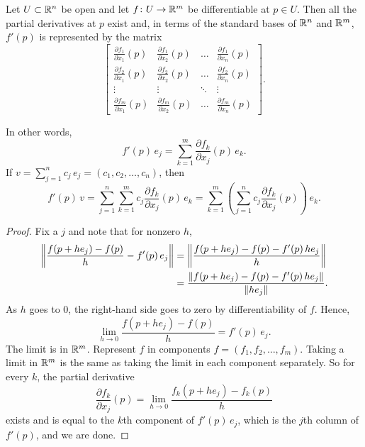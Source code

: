 \begin{prop} \label{mv:prop:jacobianmatrix}
Let $U \subset {\mathbb{R}}^n$ be open and let $f \colon U \to {\mathbb{R}}^m$ be
differentiable at $p \in U$.  Then all the partial derivatives at $p$
exist and, in terms of the standard bases of ${\mathbb{R}}^n$ and ${\mathbb{R}}^m$,
$f'(p)$ is represented by the matrix
\begin{equation*}
\begin{bmatrix}
\frac{\partial f_1}{\partial x_1}(p)
&
\frac{\partial f_1}{\partial x_2}(p)
& \ldots &
\frac{\partial f_1}{\partial x_n}(p)
\\[6pt]
\frac{\partial f_2}{\partial x_1}(p)
&
\frac{\partial f_2}{\partial x_2}(p)
& \ldots &
\frac{\partial f_2}{\partial x_n}(p)
\\
\vdots & \vdots & \ddots & \vdots
\\
\frac{\partial f_m}{\partial x_1}(p)
&
\frac{\partial f_m}{\partial x_2}(p)
& \ldots &
\frac{\partial f_m}{\partial x_n}(p)
\end{bmatrix} .
\end{equation*}
\end{prop}


In other words,
\begin{equation*}
f'(p) \, e_j =
\sum_{k=1}^m
\frac{\partial f_k}{\partial x_j}(p) \,e_k .
\end{equation*}
If $v = \sum_{j=1}^n c_j\, e_j = (c_1,c_2,\ldots,c_n)$, then
\begin{equation*}
f'(p) \, v =
\sum_{j=1}^n
\sum_{k=1}^m
 c_j
\frac{\partial f_k}{\partial x_j}(p) \,e_k
=
\sum_{k=1}^m
\left(
\sum_{j=1}^n
 c_j
\frac{\partial f_k}{\partial x_j}(p) \right) \,e_k .
\end{equation*}

\begin{proof}
Fix a $j$ and note that for nonzero $h$,
\begin{equation*}
\begin{split}
\left\lVert {\frac{f(p+h e_j)-f(p)}{h} - f'(p) \, e_j} \right\rVert & = 
\left\lVert {\frac{f(p+h e_j)-f(p) - f'(p) \, h e_j}{h}} \right\rVert \\
& =
\frac{\lVert {f(p+h e_j)-f(p) - f'(p) \, h e_j} \rVert}{\lVert {h e_j} \rVert} .
\end{split}
\end{equation*}
As $h$ goes to 0, the right-hand side goes to zero by
differentiability of $f$.  Hence,
\begin{equation*}
\lim_{h \to 0}
\frac{f(p+h e_j)-f(p)}{h} = f'(p) \, e_j  .
\end{equation*}
The limit is in ${\mathbb{R}}^m$.
Represent $f$ in components
$f = (f_1,f_2,\ldots,f_m)$.
Taking a limit in ${\mathbb{R}}^m$
is the same as taking the limit in each component separately.  
So for every $k$,
the partial derivative
\begin{equation*}
\frac{\partial f_k}{\partial x_j} (p)
=
\lim_{h \to 0}
\frac{f_k(p+h e_j)-f_k(p)}{h}
\end{equation*}
exists and is equal to the $k$th component of $f'(p)\, e_j$, which is the
$j$th column of $f'(p)$,
and we are done.
\end{proof}

